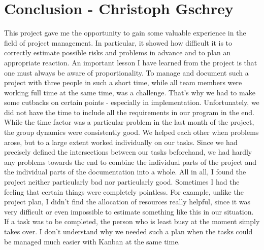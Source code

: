 \section{Conclusion - Christoph Gschrey}
This project gave me the opportunity to gain some valuable experience in the field of project management. In particular, it showed how difficult it is to correctly estimate possible risks and problems in advance and to plan an appropriate reaction. An important lesson I have learned from the project is that one must always be aware of proportionality. To manage and document such a project with three people in such a short time, while all team members were working full time at the same time, was a challenge. That's why we had to make some cutbacks on certain points - especially in implementation. Unfortunately, we did not have the time to include all the requirements in our program in the end. While the time factor was a particular problem in the last month of the project, the group dynamics were consistently good. We helped each other when problems arose, but to a large extent worked individually on our tasks. Since we had precisely defined the intersections between our tasks beforehand, we had hardly any problems towards the end to combine the individual parts of the project and the individual parts of the documentation into a whole. All in all, I found the project neither particularly bad nor particularly good. Sometimes I had the feeling that certain things were completely pointless. For example, unlike the project plan, I didn't find the allocation of resources really helpful, since it was very difficult or even impossible to estimate something like this in our situation. If a task was to be completed, the person who is least busy at the moment simply takes over. I don't understand why we needed such a plan when the tasks could be managed much easier with Kanban at the same time.